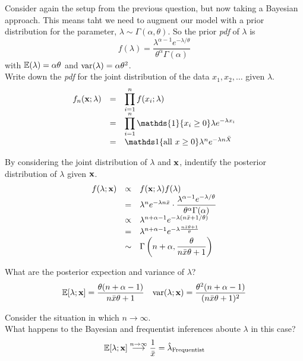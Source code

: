 \documentclass[11pt,a4paper]{article}
\begin{document}
\question
Consider again the setup from the previous question, but now taking a Bayesian approach. This means taht we need to augment our model with a prior distribution for the parameter, $\lambda\sim\Gamma(\alpha,\theta)$. So the prior \textit{pdf} of $\lambda$ is
$$f(\lambda)=\frac{\lambda^{\alpha-1}e^{-\lambda/\theta}}{\theta^\alpha\Gamma(\alpha)}$$
with $\mathbb{E}(\lambda)=\alpha\theta$ and $\mathrm{var}(\lambda)=\alpha\theta^2$.\\

\qpartnb Write down the \textit{pdf} for the joint distribution of the data $x_1,x_2,\dots$ given $\lambda$.\\

\apart
\[\begin{array}{rcl}
f_n(\x;\lambda)&=&\displaystyle\prod_{i=1}^nf(x_i;\lambda)\\
&=&\displaystyle\prod_{i=1}^n\mathds{1}\{x_i\geq0\}\lambda e^{-\lambda x_i}\\
&=&\mathds1\{\text{all }x\geq0\}\lambda^ne^{-\lambda n\bar{X}}
\end{array}\]

\qpartnb By considering the joint distribution of $\lambda$ and $\textbf{x}$, indentify the posterior distribution of $\lambda$ given $\textbf{x}$.\\

\apart
\[\begin{array}{rcl}
f(\lambda;\textbf{x})&\propto&f(\textbf{x};\lambda)f(\lambda)\\
&=&\lambda^ne^{-\lambda n\bar{x}}\cdot\dfrac{\lambda^{\alpha-1}e^{-\lambda/\theta}}{\theta^\alpha\Gamma(\alpha)}\\
&\propto&\lambda^{n+\alpha-1}e^{-\lambda(n\bar{x}+1/\theta)}\\
&=&\lambda^{n+\alpha-1}e^{-\lambda\frac{n\bar{x}\theta+1}\theta}\\
&\sim&\Gamma\left(n+\alpha,\dfrac{\theta}{n\bar{x}\theta+1}\right)
\end{array}\]

\qpartnb What are the posterior expection and variance of $\lambda$?\\

\apart
$$\mathbb{E}[\lambda;\textbf{x}]=\dfrac{\theta(n+\alpha-1)}{n\bar{x}\theta+1}\quad\mathrm{var}(\lambda;\textbf{x})=\dfrac{\theta^2(n+\alpha-1)}{(n\bar{x}\theta+1)^2}$$

\qpart
Consider the situation in which $n\to\infty$.\\
What happens to the Bayesian and frequentist inferences aboute $\lambda$ in this case?\\

\apart
$$\mathbb{E}[\lambda;\textbf{x}]\overset{n\to\infty}{\longrightarrow}\dfrac{1}{\bar{x}}=\hat\lambda_\text{Frequentist}$$
\end{document}

